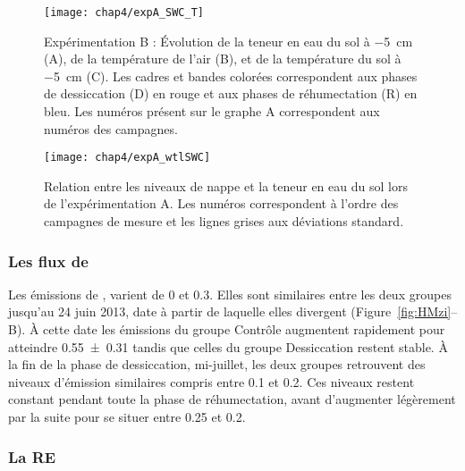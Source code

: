 \begin{figure}
\centering
\texttt{[image: chap4/expA\_SWC\_T]}
\caption{Expérimentation B : Évolution de la teneur en eau du sol à \SI{-5}{\centi\metre} (A), de la température de l'air (B), et de la température du sol à \SI{-5}{\centi\metre} (C). Les cadres et bandes colorées correspondent aux phases de dessiccation (D) en rouge et aux phases de réhumectation (R) en bleu. Les numéros présent sur le graphe A correspondent aux numéros des campagnes.}
\label{fig:HMzi_T}
\end{figure}


\begin{figure}
\centering
\texttt{[image: chap4/expA\_wtlSWC]}
\caption{Relation entre les niveaux de nappe et la teneur en eau du sol lors de l'expérimentation A. Les numéros correspondent à l'ordre des campagnes de mesure et les lignes grises aux déviations standard.}
\label{fig:wtlSWC_A}
\end{figure}

\subsubsection{Les flux de \chh}

Les émissions de \chh, varient de 0 et \SI{0.3}{\uml}.
Elles sont similaires entre les deux groupes jusqu'au 24 juin 2013, date à partir de laquelle elles divergent (Figure~\ref{fig:HMzi}--B).
À cette date les émissions du groupe Contrôle augmentent rapidement pour atteindre \SI{0.55(031)}{\uml} tandis que celles du groupe Dessiccation restent stable.
À la fin de la phase de dessiccation, mi-juillet, les deux groupes retrouvent des niveaux d'émission similaires compris entre \num{0.1} et \SI{0.2}{\uml}.
Ces niveaux restent constant pendant toute la phase de réhumectation, avant d'augmenter légèrement par la suite pour se situer entre \SI{0.25}{\uml} et \SI{0.2}{\uml}.

\subsubsection{La RE}


